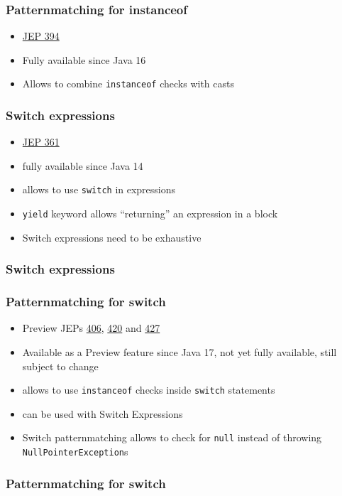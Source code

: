 \documentclass{beamer}
\begin{document}
\begin{frame}
\frametitle{Patternmatching for instanceof}
\begin{itemize}
  \item \href{https://openjdk.org/jeps/394}{JEP 394}
  \item Fully available since Java 16
  \pause
  \item Allows to combine \texttt{instanceof} checks with casts
\end{itemize}
\pause

\end{frame}

\begin{frame}
\frametitle{Switch expressions}
\begin{itemize}
  \item \href{https://openjdk.org/jeps/361}{JEP 361}
  \item fully available since Java 14
  \pause
  \item allows to use \texttt{switch} in expressions
  \item \texttt{yield} keyword allows ``returning'' an expression in a block
  \item Switch expressions need to be exhaustive
\end{itemize}
\end{frame}
\begin{frame}
\frametitle{Switch expressions}

\end{frame}

\begin{frame}
\frametitle{Patternmatching for switch}
\begin{itemize}
  \item Preview JEPs \href{https://openjdk.org/jeps/406}{406}, \href{https://openjdk.org/jeps/420}{420} and \href{https://openjdk.org/jeps/427}{427}
  \item Available as a Preview feature since Java 17, not yet fully available, still subject to change
  \pause
  \item allows to use \texttt{instanceof} checks inside \texttt{switch} statements
  \item can be used with Switch Expressions
  \item Switch patternmatching allows to check for \texttt{null} instead of throwing \texttt{NullPointerException}s
\end{itemize}
\end{frame}
\begin{frame}
\frametitle{Patternmatching for switch}

\end{frame}
\end{document}
